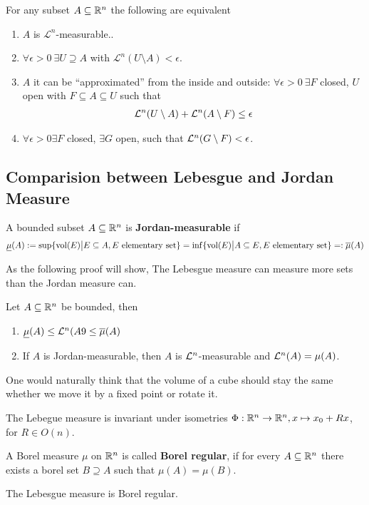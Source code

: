 \begin{thm}[]
  For any subset $A \subseteq \mathbb{R}^{n}$ the following are equivalent
  \begin{enumerate}
    \item $A$ is $\mathcal{L}^{n}$-measurable..
    \item $\forall \epsilon > 0\ \exists U \supseteq A$ with $\mathcal{L}^{n}(U \setminus A) <\epsilon$.
    \item $A$ it can be ``approximated'' from the inside and outside: $\forall \epsilon > 0\ \exists F$ closed, $U$ open with $F \subseteq A \subseteq U$ such that
      \begin{align*}
        \mathcal{L}^{n}(U \setminus A) + \mathcal{L}^{n}(A \setminus F) \leq \epsilon
      \end{align*}
    \item $\forall \epsilon > 0 \exists F$ closed, $\exists G$ open, such that $\mathcal{L}^{n}(G \setminus F) < \epsilon$.
  \end{enumerate}
\end{thm}




\subsection{Comparision between Lebesgue and Jordan Measure}
\begin{dfn}[]
A bounded subset $A \subseteq \mathbb{R}^{n}$ is \textbf{Jordan-measurable} if
\begin{align*}
  \underline{\mu}(A)
  :=
  \sup \{\operatorname{vol}(E)\big\vert E \subseteq A, E \text{ elementary set}\} 
  =
  \inf \{\operatorname{vol}(E)\big\vert A \subseteq E, E \text{ elementary set}\} 
  =:
  \overline{\mu}(A)
\end{align*}
\end{dfn}


As the following proof will show, The Lebesgue measure can measure more sets than the Jordan measure can.
\begin{thm}[]
Let $A \subseteq \mathbb{R}^{n}$ be bounded, then
\begin{enumerate}
  \item $\underline{\mu}(A) \leq\mathcal{L}^{n}(A9 \leq \overline{\mu}(A)$
  \item If $A$ is Jordan-measurable, then $A$ is $\mathcal{L}^{n}$-measurable and $\mathcal{L}^{n}(A) = \mu(A)$.
\end{enumerate}
\end{thm}

One would naturally think that the volume of a cube should stay the same whether we move it by a fixed point or rotate it.
\begin{thm}[]
  The Lebegue measure is invariant under isometries $\Phi: \mathbb{R}^{n} \to \mathbb{R}^{n}, x \mapsto x_0 + Rx$, for $R \in O(n)$.
\end{thm}


\begin{dfn}[]
  A Borel measure $\mu$ on $\mathbb{R}^{n}$ is called \textbf{Borel regular}, if for every $A \subseteq \mathbb{R}^{n}$ there exists a borel set $B \supseteq A$ such that $\mu(A) = \mu(B)$.
\end{dfn}
The Lebesgue measure is Borel regular.


